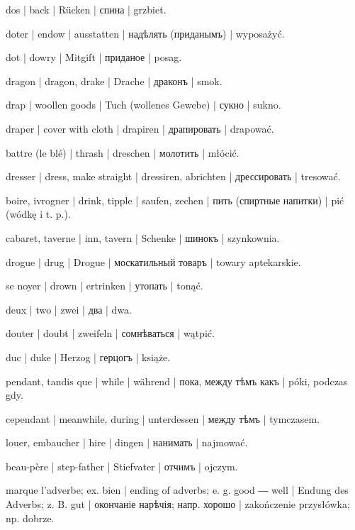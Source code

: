 \begin{outdent}{1em}
dos | back | Rücken | спина | grzbiet.

doter | endow | ausstatten | надѣлять (приданымъ) | wyposażyć.

\uvsubentry{}
dot | dowry | Mitgift | приданое | posag.

dragon | dragon, drake | Drache | драконъ | smok.

drap | woollen goods | Tuch (wollenes Gewebe) | сукно | sukno.

draper | cover with cloth | drapiren | драпировать | drapować.

battre (le blé) | thrash | dreschen | молотить | młócić.

dresser | dress, make straight | dressiren, abrichten | дрессировать | tresować.

boire, ivrogner | drink, tipple | saufen, zechen | пить
(спиртные напитки) | pić (wódkę i t. p.).

\uvsubentry{}
cabaret, taverne | inn, tavern | Schenke | шинокъ | szynkownia.

drogue | drug | Drogue | москатильный товаръ | towary aptekarskie.

se noyer | drown | ertrinken | утопать | tonąć.

deux | two | zwei | два | dwa.

douter | doubt | zweifeln | сомнѣваться | wątpić.

duc | duke | Herzog | герцогъ | książe.

pendant, tandis que | while | während | пока, между тѣмъ какъ | póki, podczas gdy.

\uvsubentry{}
cependant | meanwhile, during | unterdessen | между тѣмъ | tymczasem.

louer, embaucher | hire | dingen | нанимать | najmować.

beau-père | step-father | Stiefvater | отчимъ | ojczym.


marque l’adverbe; ex.  bien | ending of adverbs;
e. g.  good ―  well | Endung des Adverbs; z. B. 
gut | окончаніе нарѣчія; напр.  хорошо | zakończenie
przysłówka; np.  dobrze.


\end{outdent}
